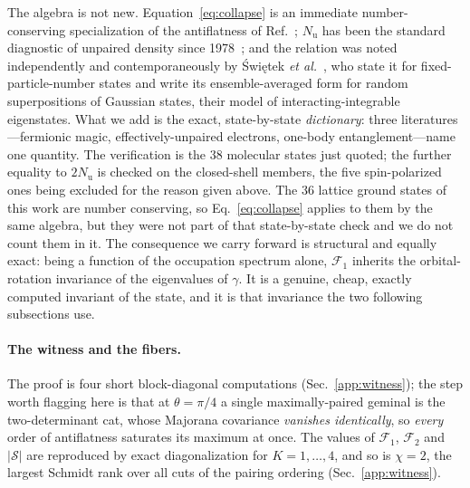 The algebra is not new. Equation~\eqref{eq:collapse} is an immediate number-conserving
specialization of the antiflatness of Ref.~\cite{sierant2026}; $N_{\mathrm u}$ has been the standard
diagnostic of unpaired density since 1978~\cite{takatsuka1978}; and the relation was noted
independently and contemporaneously by \'Swi\k{e}tek \emph{et al.}~\cite{swietek2026}, who state it
for fixed-particle-number states and write its ensemble-averaged form for random superpositions of
Gaussian states, their model of interacting-integrable eigenstates. What we add is the exact, state-by-state \emph{dictionary}: three
literatures---fermionic magic, effectively-unpaired electrons, one-body entanglement---name one quantity.
The verification is the $38$ molecular states just quoted; the further equality to $2N_{\mathrm u}$ is
checked on the closed-shell members, the five spin-polarized ones being excluded for the reason given
above. The $36$ lattice ground states of this work are number conserving, so
Eq.~\eqref{eq:collapse} applies to them by the same algebra, but they were not part of that
state-by-state check and we do not count them in it. The consequence we carry
forward is structural and equally exact: being a function of the occupation spectrum alone,
$\mathcal F_1$ inherits the orbital-rotation invariance of the eigenvalues of $\gamma$. It is a genuine,
cheap, exactly computed invariant of the state, and it is that invariance the two following subsections
use.

\paragraph{The witness and the fibers.} \noindent The proof is four short block-diagonal computations (Sec.~\ref{app:witness}); the step worth
flagging here is that at $\theta=\pi/4$ a single maximally-paired geminal is the two-determinant cat,
whose Majorana covariance \emph{vanishes identically}, so \emph{every} order of antiflatness saturates its
maximum at once. The values of $\mathcal F_1$, $\mathcal F_2$ and $|\mathcal S|$ are reproduced by
exact diagonalization for $K=1,\dots,4$, and so is $\chi=2$, the largest Schmidt rank over all cuts of
the pairing ordering (Sec.~\ref{app:witness}).

